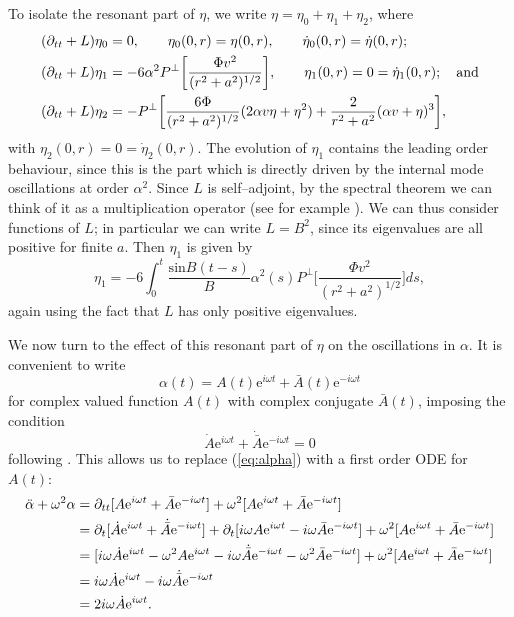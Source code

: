To isolate the resonant part of $\eta$, we write $\eta=\eta_0 + \eta_1 + \eta_2$, where
\begin{align}
(\partial_{tt}+L)\eta_0 &= 0, \qquad \eta_0(0,r)=\eta(0,r),\qquad \dot{\eta}_0(0,r) = \dot{\eta}(0,r); \\
(\partial_{tt} + L)\eta_1 &= -6\alpha^2P^\perp\bigg[\frac{\Phi v^2}{(r^2+a^2)^{1/2}}\bigg], \qquad \eta_1(0,r)=0=\dot{\eta}_1(0,r); \quad \mathrm{and} \\
(\partial_{tt} + L)\eta_2 &= -P^\perp\bigg[\frac{6\Phi}{(r^2+a^2)^{1/2}} (2\alpha v\eta + \eta^2) + \frac{2}{r^2+a^2} (\alpha v + \eta)^3 \bigg],
\end{align}
with $\eta_2(0,r)=0=\dot{\eta}_2(0,r)$. The evolution of $\eta_1$ contains the leading order behaviour, since this is the part which is directly driven by the internal mode oscillations at order $\alpha^2$.  Since $L$ is self--adjoint, by the spectral theorem we can think of it as a multiplication operator (see for example \cite{Hall}). We can thus consider functions of $L$; in particular we can write $L=B^2$, since its eigenvalues are all positive for finite $a$. Then $\eta_1$ is given by
\[
\eta_1 = -6 \int_0^t \frac{\mathrm{sin}B(t-s)}{B}\alpha^2(s)P^\perp\bigg[\frac{\Phi v^2}{(r^2+a^2)^{1/2}}\bigg]ds,
\]
again using the fact that $L$ has only positive eigenvalues.


We now turn to the effect of this resonant part of $\eta$ on the oscillations in $\alpha$. It is convenient to write
\[
\alpha(t) = A(t)\mathrm{e}^{i\omega t} + \bar{A}(t)\mathrm{e}^{-i\omega t}
\]
for complex valued function $A(t)$ with complex conjugate $\bar{A}(t)$, imposing the condition
\[
\dot{A}\mathrm{e}^{i\omega t} + \dot{\bar{A}}\mathrm{e}^{-i\omega t} = 0
\]
following \cite{SW99}. This allows us to replace (\ref{eq:alpha}) with a first order ODE for $A(t)$:
\begin{align*}
\ddot{\alpha} + \omega^2 \alpha &= \partial_{tt}[A\mathrm{e}^{i\omega t} + \bar{A}\mathrm{e}^{-i\omega t}] + \omega^2[A\mathrm{e}^{i\omega t} + \bar{A}\mathrm{e}^{-i\omega t}] \\
&= \partial_t[\dot{A}\mathrm{e}^{i\omega t} + \dot{\bar{A}}\mathrm{e}^{-i\omega t}]
+ \partial_t[i\omega A\mathrm{e}^{i\omega t} - i\omega\bar{A}\mathrm{e}^{-i\omega t}]
+ \omega^2[A\mathrm{e}^{i\omega t} + \bar{A}\mathrm{e}^{-i\omega t}] \\
&= [i\omega \dot{A}\mathrm{e}^{i\omega t} - \omega^2A\mathrm{e}^{i\omega t} - i\omega\dot{\bar{A}}\mathrm{e}^{-i\omega t} - \omega^2\bar{A}\mathrm{e}^{-i\omega t}] + \omega^2[A\mathrm{e}^{i\omega t} + \bar{A}\mathrm{e}^{-i\omega t}] \\
&= i\omega \dot{A}\mathrm{e}^{i\omega t} - i\omega\dot{\bar{A}}\mathrm{e}^{-i\omega t} \\
&= 2i\omega \dot{A}\mathrm{e}^{i\omega t}.
\end{align*}

